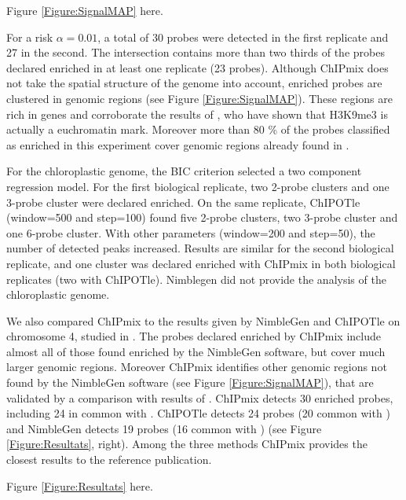 \documentclass{bioinfo}
\begin{document}
\begin{center}
  Figure \ref{Figure:SignalMAP} here.
\end{center}

For a risk $\alpha=0.01$, a total of 30 probes were detected in
the first replicate and 27 in the second. The intersection
contains more than two thirds of the probes declared enriched in at
least one replicate (23 probes). Although ChIPmix does not take
the spatial structure of the genome into account, enriched probes
are clustered in genomic regions (see Figure
\ref{Figure:SignalMAP}). These regions are rich in genes and
corroborate the results of \cite{Turck07}, who have shown that
H3K9me3 is actually a euchromatin mark. Moreover more than 80 \% of
the probes classified as enriched in this experiment cover genomic
regions already found in \cite{Turck07}.

For the chloroplastic genome, the BIC criterion selected a two component
regression model. For the first biological replicate, two 2-probe clusters and one 3-probe cluster were declared enriched. On the same replicate, ChIPOTle (window=500 and step=100) found five 2-probe clusters, two 3-probe cluster and one 6-probe cluster. With other parameters (window=200 and step=50), the number of detected peaks increased. Results are similar for the second biological replicate, and one cluster was declared enriched with ChIPmix in both biological replicates (two with ChIPOTle). Nimblegen did not provide the analysis of the chloroplastic genome.

We also compared ChIPmix to the results given by NimbleGen and
ChIPOTle on chromosome 4, studied in \cite{Turck07}.
The probes declared enriched by ChIPmix include almost all of
those found enriched by the NimbleGen software, but cover much
larger genomic regions. Moreover ChIPmix identifies other genomic
regions not found by the NimbleGen software (see Figure
\ref{Figure:SignalMAP}), that are validated by a comparison with
results of  \cite{Turck07}. ChIPmix detects 30 enriched probes,
including 24 in common with \cite{Turck07}. ChIPOTle detects
24 probes (20 common with \cite{Turck07}) and NimbleGen
detects 19 probes (16 common with \cite{Turck07}) (see Figure \ref{Figure:Resultats}, right). Among
the three methods ChIPmix provides the closest results to the
reference publication.

\begin{center}
  Figure \ref{Figure:Resultats} here.
\end{center}
\end{document}
